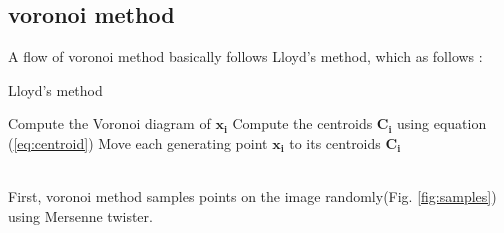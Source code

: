 \documentclass[11pt]{article}
\begin{document}
\subsection{voronoi method}
A flow of voronoi method basically follows Lloyd's method\cite{Okabe:1992:STC:135734}, which as follows : \\
\begin{algorithm}
\caption{Lloyd's method}\label{alg:lloyds}
\begin{algorithmic}[1]
    \State Compute the Voronoi diagram of $\mathbf{x_i}$
    \State Compute the centroids $\mathbf{C_i}$ using equation (\ref{eq:centroid})
    \State Move each generating point $\mathbf{x_i}$ to its centroids $\mathbf{C_i}$
\EndWhile
\end{algorithmic}
\end{algorithm}\\
First, voronoi method samples points on the image randomly(Fig. \ref{fig:samples}) using Mersenne twister. 
\end{document}
